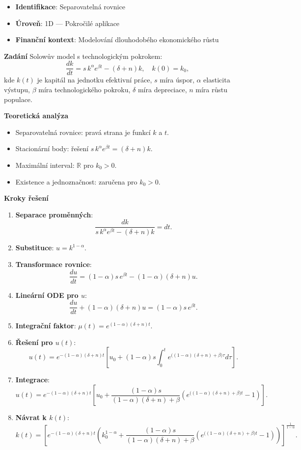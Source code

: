 \begin{example}
\label{ex:ekonomicky-rust}

\begin{itemize}
\item \textbf{Identifikace}: Separovatelná rovnice
\item \textbf{Úroveň}: 1D — Pokročilé aplikace
\item \textbf{Finanční kontext}: Modelování dlouhodobého ekonomického růstu
\end{itemize}

\noindent\textbf{Zadání}
Solowův model s technologickým pokrokem:
\[
\frac{dk}{dt} = s\,k^\alpha e^{\beta t} - (\delta + n)k, \quad k(0) = k_0,
\]
kde $k(t)$ je kapitál na jednotku efektivní práce, $s$ míra úspor, $\alpha$ elasticita výstupu, $\beta$ míra technologického pokroku, $\delta$ míra depreciace, $n$ míra růstu populace.

\noindent\textbf{Teoretická analýza}
\begin{itemize}
\item Separovatelná rovnice: pravá strana je funkcí $k$ a $t$.
\item Stacionární body: řešení $s\,k^\alpha e^{\beta t} = (\delta + n)k$.
\item Maximální interval: $\mathbb{R}$ pro $k_0 > 0$.
\item Existence a jednoznačnost: zaručena pro $k_0 > 0$.
\end{itemize}

\noindent\textbf{Kroky řešení}
\begin{enumerate}
\item \textbf{Separace proměnných}:
\[
\frac{dk}{s\,k^\alpha e^{\beta t} - (\delta + n)k} = dt.
\]
\item \textbf{Substituce}: $u = k^{1-\alpha}$.
\item \textbf{Transformace rovnice}:
\[
\frac{du}{dt} = (1-\alpha)s\,e^{\beta t} - (1-\alpha)(\delta + n)u.
\]
\item \textbf{Lineární ODE pro $u$}:
\[
\frac{du}{dt} + (1-\alpha)(\delta + n)u = (1-\alpha)s\,e^{\beta t}.
\]
\item \textbf{Integrační faktor}: $\mu(t) = e^{(1-\alpha)(\delta + n)t}$.
\item \textbf{Řešení pro $u(t)$}:
\[
u(t) = e^{-(1-\alpha)(\delta + n)t}\!\left[u_0 + (1-\alpha)s \!\int_0^t e^{\big((1-\alpha)(\delta + n) + \beta\big)\tau} d\tau \right].
\]
\item \textbf{Integrace}:
\[
u(t) = e^{-(1-\alpha)(\delta + n)t}\!\left[u_0 + \frac{(1-\alpha)s}{(1-\alpha)(\delta + n) + \beta}\!\left(e^{\big((1-\alpha)(\delta + n) + \beta\big)t} - 1\right)\right].
\]
\item \textbf{Návrat k $k(t)$}:
\[
k(t) = \left[e^{-(1-\alpha)(\delta + n)t}\!\left(k_0^{1-\alpha} + \frac{(1-\alpha)s}{(1-\alpha)(\delta + n) + \beta}\!\left(e^{\big((1-\alpha)(\delta + n) + \beta\big)t} - 1\right)\right)\right]^{\tfrac{1}{1-\alpha}}.
\]
\end{enumerate}


\end{example}
